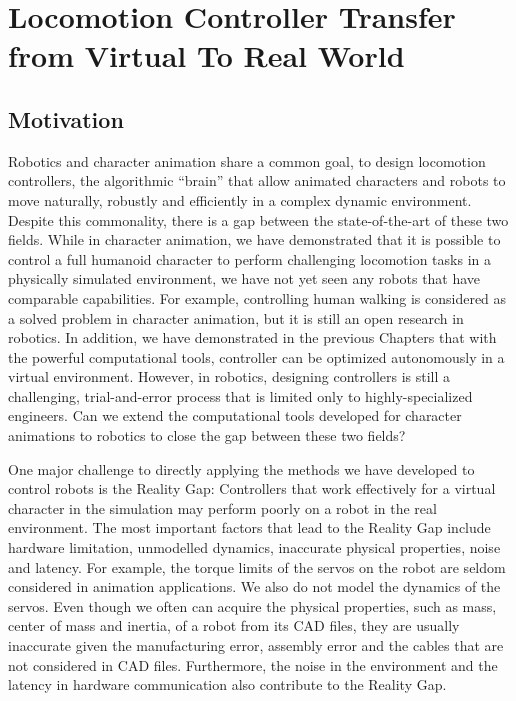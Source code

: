 \chapter{Locomotion Controller Transfer from Virtual To Real World}
\section{Motivation}
Robotics and character animation share a common goal, to design locomotion controllers, the algorithmic ``brain'' that allow animated characters and robots to move naturally, robustly and efficiently in a complex dynamic environment. Despite this commonality, there is a gap between the state-of-the-art of these two fields. While in character animation, we have demonstrated that it is possible to control a full humanoid character to perform challenging locomotion tasks in a physically simulated environment, we have not yet seen any robots that have comparable capabilities. For example, controlling human walking is considered as a solved problem in character animation, but it is still an open research in robotics. In addition, we have demonstrated in the previous Chapters that with the powerful computational tools, controller can be optimized autonomously in a virtual environment. However, in robotics, designing controllers is still a challenging, trial-and-error process that is limited only to highly-specialized engineers. Can we extend the computational tools developed for character animations to robotics to close the gap between these two fields?

One major challenge to directly applying the methods we have developed to control robots is the Reality Gap: Controllers that work effectively for a virtual character in the simulation may perform poorly on a robot in the real environment. The most important factors that lead to the Reality Gap include hardware limitation, unmodelled dynamics, inaccurate physical properties, noise and latency. For example, the torque limits of the servos on the robot are seldom considered in animation applications. We also do not model the dynamics of the servos. Even though we often can acquire the physical properties, such as mass, center of mass and inertia, of a robot from its CAD files, they are usually inaccurate given the manufacturing error, assembly error and the cables that are not considered in CAD files. Furthermore, the noise in the environment and the latency in hardware communication also contribute to the Reality Gap.

